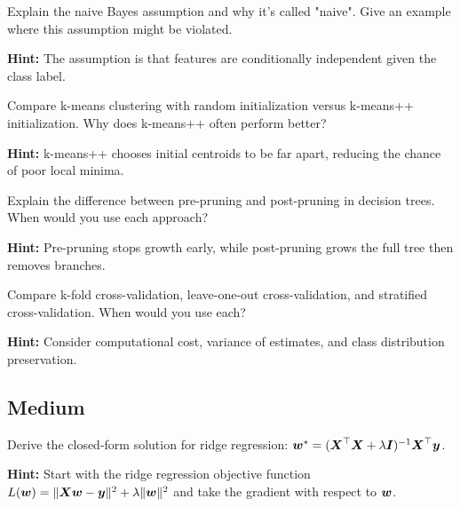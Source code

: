 \begin{problem}
\label{prob:naive-bayes}
Explain the naive Bayes assumption and why it's called "naive". Give an example where this assumption might be violated.

\textbf{Hint:} The assumption is that features are conditionally independent given the class label.
\end{problem}

\begin{problem}
\label{prob:kmeans-init}
Compare k-means clustering with random initialization versus k-means++ initialization. Why does k-means++ often perform better?

\textbf{Hint:} k-means++ chooses initial centroids to be far apart, reducing the chance of poor local minima.
\end{problem}

\begin{problem}
\label{prob:tree-pruning}
Explain the difference between pre-pruning and post-pruning in decision trees. When would you use each approach?

\textbf{Hint:} Pre-pruning stops growth early, while post-pruning grows the full tree then removes branches.
\end{problem}

\begin{problem}
\label{prob:cross-validation}
Compare k-fold cross-validation, leave-one-out cross-validation, and stratified cross-validation. When would you use each?

\textbf{Hint:} Consider computational cost, variance of estimates, and class distribution preservation.
\end{problem}

\subsection*{Medium}

\begin{problem}
\label{prob:ridge-derivation}
Derive the closed-form solution for ridge regression: $\boldsymbol{w}^* = (\boldsymbol{X}^\top \boldsymbol{X} + \lambda \boldsymbol{I})^{-1} \boldsymbol{X}^\top \boldsymbol{y}$.

\textbf{Hint:} Start with the ridge regression objective function $L(\boldsymbol{w}) = \|\boldsymbol{X}\boldsymbol{w} - \boldsymbol{y}\|^2 + \lambda \|\boldsymbol{w}\|^2$ and take the gradient with respect to $\boldsymbol{w}$.
\end{problem}

